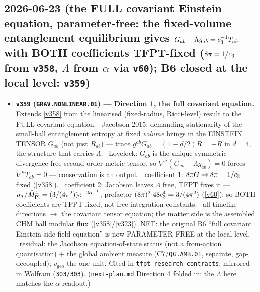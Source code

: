 \subsection*{2026-06-23 (the FULL covariant Einstein equation, parameter-free: the fixed-volume entanglement equilibrium gives $G_{ab}+\Lambda g_{ab}=c_3^{-1}T_{ab}$ with BOTH coefficients TFPT-fixed ($8\pi=1/c_3$ from \texttt{v358}, $\Lambda$ from $\alpha$ via \texttt{v60}); B6 closed at the local level: \texttt{v359})}
\begin{itemize}
\item \textbf{\texttt{v359} (\texttt{GRAV.NONLINEAR.01}) --- Direction 1, the full covariant equation.} Extends \vref{v358}
from the linearised (fixed-radius, Ricci-level) result to the FULL covariant equation. \mC\mE\ Jacobson 2015: demanding
stationarity of the small-ball entanglement entropy at fixed \emph{volume} brings in the EINSTEIN TENSOR $G_{ab}$
(not just $R_{ab}$) --- trace $g^{ab}G_{ab}=(1-d/2)R=-R$ in $d{=}4$, the structure that carries $\Lambda$. \mE\
Lovelock: $G_{ab}$ is the unique symmetric divergence-free second-order metric tensor, so $\nabla^a(G_{ab}+\Lambda
g_{ab})=0$ forces $\nabla^a T_{ab}=0$ --- conservation is an output. \mE\ coefficient 1: $8\pi G\to 8\pi=1/c_3$
fixed (\vref{v358}). \mE\ coefficient 2: Jacobson leaves $\Lambda$ free, TFPT fixes it ---
$\rho_\Lambda/\bar M_{\mathrm{Pl}}^4=(3/(4\pi^2))e^{-2\alpha^{-1}}$, prefactor $(8\pi)^2{\cdot}48c_3^4=3/(4\pi^2)$ (\vref{v60}); so
BOTH coefficients are TFPT-fixed, not free integration constants. \mC\ all timelike directions $\to$ the covariant
tensor equation; the matter side is the assembled CHM ball modular flux (\vref{v358}/\vref{v323}). NET: the original B6
``full covariant Einstein-side field equation'' is now PARAMETER-FREE at the local level. \mO\ residual: the Jacobson
equation-of-state status (not a from-action quantisation) $+$ the global ambient measure (C7/\texttt{QG.AMB.01},
separate, gap-decoupled); $v_{\mathrm{geo}}$ the one unit. Cited in \texttt{tfpt\_research\_contracts}; mirrored in
Wolfram (\texttt{303/303}). (\texttt{next-plan.md} Direction 4 folded in: the $\Lambda$ here matches the $\alpha$-readout.)
\end{itemize}

